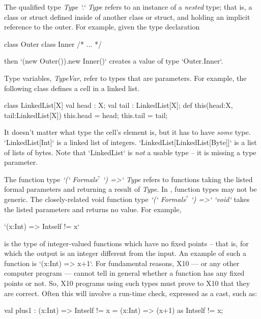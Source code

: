 The qualified type {\em Type \xcd`.` Type} refers to an instance of a {\em
nested} type; that is, a class or struct defined inside of another class or
struct, and holding an implicit reference to the outer.  For example, given
the type declaration 
\begin{xten}
class Outer {
  class Inner { /* ... */ }
}
\end{xten}
%
then 
\xcd`(new Outer()).new Inner()` creates a value of type 
\xcd`Outer.Inner`.

Type variables, {\em TypeVar}, refer to types that are parameters.  For
example, the following class defines a cell in a linked list.  
\begin{xten}
class LinkedList[X] {
  val head : X;
  val tail : LinkedList[X];
  def this(head:X, tail:LinkedList[X]) {
     this.head = head; this.tail = tail;
  }
}
\end{xten}
%
It doesn't
matter what type the cell's element is, but it has to have {\em some} type.
\xcd`LinkedList[Int]` is a linked list of integers.
\xcd`LinkedList[LinkedList[Byte]]` is a list of lists of bytes.
Note that \xcd`LinkedList` is {\em not} a usable type -- it is missing a type parameter.



The function type 
{\em \xcd`(` Formals{$^?$} \xcd`) =>`  Type} 
refers to functions taking the
listed formal parameters and returning a result of {\em Type}.  In
\XtenCurrVer, function types may not be generic.
The closely-related void function type 
{\em \xcd`(` Formals{$^?$} \xcd`) =>`  \xcd`void`}  takes the listed
parameters and returns no value.
For example, 
\begin{xtenmath}
\xcd`(x:Int) => Int{self != x}` 
\end{xtenmath}
is the type of integer-valued functions which have no fixed points -- that is,
for which the output is an integer different from the input.
An example of such a function is \xcd`(x:Int) => x+1`.
For fundamental reasons, X10 --- or any other computer program --- cannot
tell in general whether a function has any fixed points or not.  So, X10
programs using such types must prove to X10 that they are correct. Often this
will involve a run-time check, expressed as a cast, such as: 
\begin{xten}
  val plus1 : (x:Int) => Int{self != x} = 
     (x:Int) => (x+1) as Int{self != x}; 
\end{xten}


